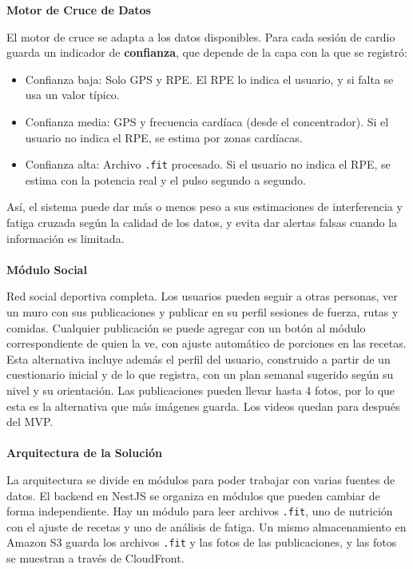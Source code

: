 \textbf{Motor de Cruce de Datos}

El motor de cruce se adapta a los datos disponibles. Para cada sesión de cardio guarda un indicador de \textbf{confianza}, que depende de la capa con la que se registró:
\begin{itemize}
    \item Confianza baja: Solo GPS y RPE. El RPE lo indica el usuario, y si falta se usa un valor típico.
    \item Confianza media: GPS y frecuencia cardíaca (desde el concentrador). Si el usuario no indica el RPE, se estima por zonas cardíacas.
    \item Confianza alta: Archivo \texttt{.fit} procesado. Si el usuario no indica el RPE, se estima con la potencia real y el pulso segundo a segundo.
\end{itemize}
Así, el sistema puede dar más o menos peso a sus estimaciones de interferencia y fatiga cruzada según la calidad de los datos, y evita dar alertas falsas cuando la información es limitada.
\\\\
\textbf{Módulo Social}

Red social deportiva completa. Los usuarios pueden seguir a otras personas, ver un muro con sus publicaciones y publicar en su perfil sesiones de fuerza, rutas y comidas. Cualquier publicación se puede agregar con un botón al módulo correspondiente de quien la ve, con ajuste automático de porciones en las recetas. Esta alternativa incluye además el perfil del usuario, construido a partir de un cuestionario inicial y de lo que registra, con un plan semanal sugerido según su nivel y su orientación. Las publicaciones pueden llevar hasta 4 fotos, por lo que esta es la alternativa que más imágenes guarda. Los videos quedan para después del MVP.
\\\\
\textbf{Arquitectura de la Solución}

La arquitectura se divide en módulos para poder trabajar con varias fuentes de datos. El backend en NestJS se organiza en módulos que pueden cambiar de forma independiente. Hay un módulo para leer archivos \texttt{.fit}, uno de nutrición con el ajuste de recetas y uno de análisis de fatiga. Un mismo almacenamiento en Amazon S3 guarda los archivos \texttt{.fit} y las fotos de las publicaciones, y las fotos se muestran a través de CloudFront.

